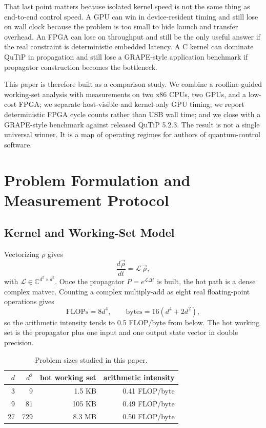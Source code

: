 \documentclass[3p,times,twocolumn]{elsarticle}
\newcommand{\dv}[2]{\frac{d#1}{d#2}}
\begin{document}
That last point matters because isolated kernel speed is not the same thing
as end-to-end control speed. A GPU can win in device-resident timing and
still lose on wall clock because the problem is too small to hide launch and
transfer overhead. An FPGA can lose on throughput and still be the only
useful answer if the real constraint is deterministic embedded latency. A C
kernel can dominate QuTiP in propagation and still lose a GRAPE-style
application benchmark if propagator construction becomes the bottleneck.

This paper is therefore built as a comparison study. We combine a
roofline-guided working-set analysis with measurements on two x86 CPUs, two
GPUs, and a low-cost FPGA; we separate host-visible and kernel-only GPU
timing; we report deterministic FPGA cycle counts rather than USB wall time;
and we close with a GRAPE-style benchmark against released QuTiP 5.2.3. The
result is not a single universal winner. It is a map of operating regimes
for authors of quantum-control software.

\section{Problem Formulation and Measurement Protocol}

\subsection{Kernel and Working-Set Model}

Vectorizing $\rho$ gives
\begin{equation}
  \dv{\vec{\rho}}{t} = \mathcal{L}\,\vec{\rho},
\end{equation}
with $\mathcal{L}\in\mathbb{C}^{d^2\times d^2}$. Once the propagator
$P=e^{\mathcal{L}\Delta t}$ is built, the hot path is a dense complex
matvec. Counting a complex multiply-add as eight real floating-point
operations gives
\begin{equation}
  \mathrm{FLOPs} = 8d^4, \qquad
  \mathrm{bytes} = 16(d^4 + 2d^2),
\end{equation}
so the arithmetic intensity tends to 0.5 FLOP/byte from below. The hot
working set is the propagator plus one input and one output state vector in
double precision.

\begin{table}[t]
  \centering
  \caption{Problem sizes studied in this paper.}
  \label{tab:problem_sizes}
  \small
  \begin{tabular}{@{}rrrr@{}}
    \toprule
    $d$ & $d^2$ & hot working set & arithmetic intensity \\
    \midrule
    3 & 9 & 1.5 KB & 0.41 FLOP/byte \\
    9 & 81 & 105 KB & 0.49 FLOP/byte \\
    27 & 729 & 8.3 MB & 0.50 FLOP/byte \\
    \bottomrule
  \end{tabular}
\end{table}
\end{document}
